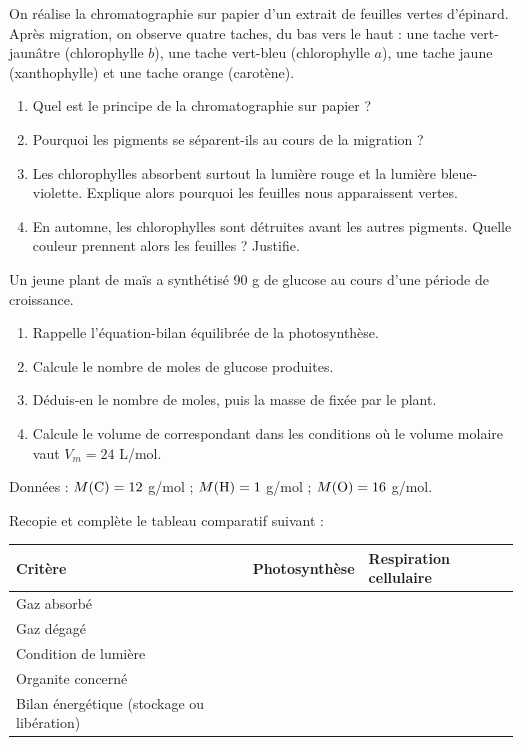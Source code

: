\documentclass[11pt]{article}
\begin{document}
\begin{exercice}
On réalise la chromatographie sur papier d'un extrait de feuilles vertes d'épinard. Après migration, on observe quatre taches, du bas vers le haut : une tache vert-jaunâtre (chlorophylle $b$), une tache vert-bleu (chlorophylle $a$), une tache jaune (xanthophylle) et une tache orange (carotène).
\begin{enumerate}
\item Quel est le principe de la chromatographie sur papier ?
\item Pourquoi les pigments se séparent-ils au cours de la migration ?
\item Les chlorophylles absorbent surtout la lumière rouge et la lumière bleue-violette. Explique alors pourquoi les feuilles nous apparaissent vertes.
\item En automne, les chlorophylles sont détruites avant les autres pigments. Quelle couleur prennent alors les feuilles ? Justifie.
\end{enumerate}
\end{exercice}

\begin{exercice}
Un jeune plant de maïs a synthétisé 90 g de glucose au cours d'une période de croissance.
\begin{enumerate}
\item Rappelle l'équation-bilan équilibrée de la photosynthèse.
\item Calcule le nombre de moles de glucose produites.
\item Déduis-en le nombre de moles, puis la masse de  fixée par le plant.
\item Calcule le volume de  correspondant dans les conditions où le volume molaire vaut $V_m = 24$ L/mol.
\end{enumerate}
Données : $M(\ce{C}) = 12$ g/mol ; $M(\ce{H}) = 1$ g/mol ; $M(\ce{O}) = 16$ g/mol.
\end{exercice}

\begin{exercice}
Recopie et complète le tableau comparatif suivant :
\begin{center}
\begin{tabularx}{\linewidth}{|l|X|X|}
\hline
\rowcolor{popblueL} \textbf{Critère} & \textbf{Photosynthèse} & \textbf{Respiration cellulaire} \\
\hline
Gaz absorbé & & \\
\hline
Gaz dégagé & & \\
\hline
Condition de lumière & & \\
\hline
Organite concerné & & \\
\hline
Bilan énergétique (stockage ou libération) & & \\
\hline
\end{tabularx}
\end{center}
\end{exercice}
\end{document}
